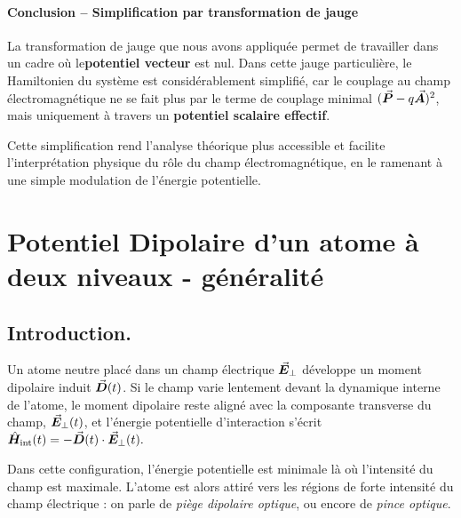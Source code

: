 \paragraph{Conclusion – Simplification par transformation de jauge}
\bigskip
La transformation de jauge que nous avons appliquée permet de travailler dans un cadre où le{\bf  potentiel vecteur} est nul. Dans cette jauge particulière, le Hamiltonien du système est considérablement simplifié, car le couplage au champ électromagnétique ne se fait plus par le terme de couplage minimal \((\vec{{\bm{P}}} - q \vec{{\bm{A}}})^2\), mais uniquement à travers un {\bf potentiel scalaire effectif}.

Cette simplification rend l’analyse théorique plus accessible et facilite l’interprétation physique du rôle du champ électromagnétique, en le ramenant à une simple modulation de l’énergie potentielle.




\section{Potentiel Dipolaire d'un atome à deux niveaux - généralité}

\subsection{Introduction.}
Un atome neutre placé dans un champ électrique $\vec{{\bm{E}}}_\perp$ développe un moment dipolaire induit $\vec{{\bm{D}}}(t)$. Si le champ varie lentement devant la dynamique interne de l’atome, le moment dipolaire reste aligné avec la composante transverse du champ, $\vec{{\bm{E}}}_\perp(t)$, et l’énergie potentielle d’interaction s’écrit 
\(
 \hat{\bm{H}}_{\text{int}}(t) = -\vec{{\bm{D}}}(t) \cdot \vec{{\bm{E}}}_\perp(t).
\)

Dans cette configuration, l’énergie potentielle est minimale là où l’intensité du champ est maximale. L’atome est alors attiré vers les régions de forte intensité du champ électrique : on parle de \textit{piège dipolaire optique}, ou encore de \textit{pince optique}.


